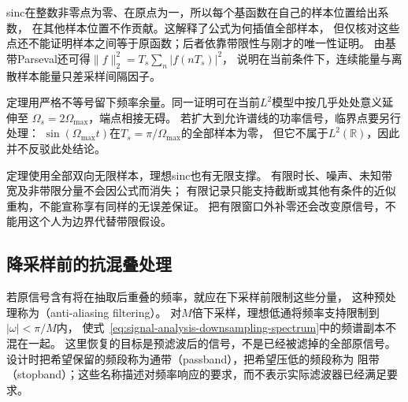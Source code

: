 sinc在整数非零点为零、在原点为一，所以每个基函数在自己的样本位置给出系数，
在其他样本位置不作贡献。这解释了公式为何插值全部样本，
但仅核对这些点还不能证明样本之间等于原函数；后者依靠带限性与刚才的唯一性证明。
由基带Parseval还可得$\|f\|_2^2=T_s\sum_n|f(nT_s)|^2$，
说明在当前条件下，连续能量与离散样本能量只差采样间隔因子。

定理用严格不等号留下频率余量。同一证明可在当前$L^2$模型中按几乎处处意义延伸至
$\Omega_s=2\Omega_{\max}$，端点相接无碍。
若扩大到允许谱线的功率信号，临界点要另行处理：
$\sin(\Omega_{\max}t)$在$T_s=\pi/\Omega_{\max}$的全部样本为零，
但它不属于$L^2(\mathbb R)$，因此并不反驳此处结论。

定理使用全部双向无限样本，理想sinc也有无限支撑。
有限时长、噪声、未知带宽及非带限分量不会因公式而消失；
有限记录只能支持截断或其他有条件的近似重构，不能宣称享有同样的无误差保证。
把有限窗口外补零还会改变原信号，不能用这个人为边界代替带限假设。

\subsection{降采样前的抗混叠处理}

若原信号含有将在抽取后重叠的频率，就应在下采样前限制这些分量，
这种预处理称为（anti-aliasing filtering）。
对$M$倍下采样，理想低通将频率支持限制到$|\omega|<\pi/M$内，
使式~\eqref{eq:signal-analysis-downsampling-spectrum}中的频谱副本不混在一起。
这里恢复的目标是预滤波后的信号，不是已经被滤掉的全部原信号。
设计时把希望保留的频段称为通带（passband），把希望压低的频段称为
阻带（stopband）；这些名称描述对频率响应的要求，而不表示实际滤波器已经满足要求。

